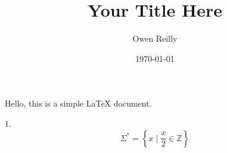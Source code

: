 \documentclass[11pt]{article}
\title{Your Title Here}
\author{Owen Reilly}
\date{\today}
\begin{document}
\maketitle

Hello, this is a simple LaTeX document.

1. \[\Sigma^* = \left\{ x \mid \frac{x}{2} \in \mathbb{Z} \right\}\]
\end{document}
